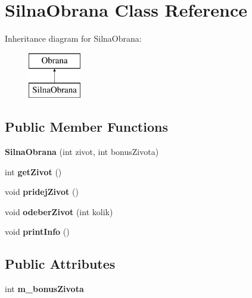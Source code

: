 \hypertarget{class_silna_obrana}{}\section{Silna\+Obrana Class Reference}
\label{class_silna_obrana}
Inheritance diagram for Silna\+Obrana\+:\begin{figure}[H]
\begin{center}
\leavevmode
\includegraphics[height=2.000000cm]{class_silna_obrana}
\end{center}
\end{figure}
\subsection*{Public Member Functions}
\begin{DoxyCompactItemize}
\item 
\mbox{\label{class_silna_obrana_afeb3f07819fea724a186ac8764133a2a}} 
{\bfseries Silna\+Obrana} (int zivot, int bonus\+Zivota)
\item 
\mbox{\label{class_silna_obrana_a156b6f7628df8af5055cf175211dc4e1}} 
int {\bfseries get\+Zivot} ()
\item 
\mbox{\label{class_silna_obrana_a1a7201249cdd63d650f471fa1806a336}} 
void {\bfseries pridej\+Zivot} ()
\item 
\mbox{\label{class_silna_obrana_af9c1e2bf4e5035d716eabae03036dfb3}} 
void {\bfseries odeber\+Zivot} (int kolik)
\item 
\mbox{\label{class_silna_obrana_af5dcf84053649d61af9b6e364948330b}} 
void {\bfseries print\+Info} ()
\end{DoxyCompactItemize}
\subsection*{Public Attributes}
\begin{DoxyCompactItemize}
\item 
\mbox{\label{class_silna_obrana_a71f41e0e15e7e77b12eb27657b12abf6}} 
int {\bfseries m\+\_\+bonus\+Zivota}
\end{DoxyCompactItemize}
